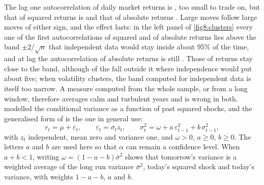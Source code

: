 \begin{chapterrefs}
The lag one autocorrelation of daily market returns is \acRet, too small to trade on, but that of
squared returns is \acSq{} and that of absolute returns \acAbs. Large moves follow large moves of
either sign, and the effect lasts: in the left panel of \cref{fig8:clusters} every one of the first
\acLags{} autocorrelations of squared and of absolute returns lies above the band $\pm2/\sqrt n$ that
independent data would stay inside about 95\% of the time, and at lag \acLags{} the autocorrelation of
absolute returns is still \acAbsHundred. Those of returns stay close to the band, although \acRetOut{} of
the \acLags{} fall outside it where independence would put about five; when volatility clusters, the band
computed for independent data is itself too narrow. A measure computed from the whole sample, or from a long window, therefore averages calm
and turbulent years and is wrong in both. \textcite{engle1982} modelled the conditional variance as a
function of past squared shocks, and the generalised form of \textcite{bollerslev1986} is the one in
general use:
\begin{equation}\label{eq8:garch}
  r_t=\mu+\varepsilon_t,\qquad \varepsilon_t=\sigma_t z_t,\qquad
  \sigma_t^2=\omega+a\,\varepsilon_{t-1}^2+b\,\sigma_{t-1}^2,
\end{equation}
with $z_t$ independent, mean zero and variance one, and $\omega>0$, $a\ge0$, $b\ge0$. The letters $a$
and $b$ are used here so that $\alpha$ can remain a confidence level. When $a+b<1$, writing
$\omega=(1-a-b)\bar\sigma^2$ shows that tomorrow's variance is a weighted average of the long run variance
$\bar\sigma^2$, today's squared shock and today's variance, with weights $1-a-b$, $a$ and $b$.


\end{chapterrefs}
